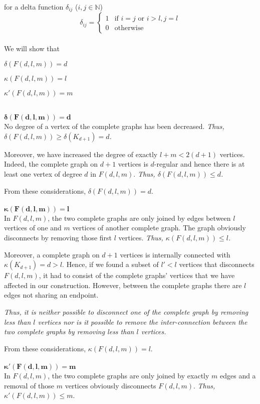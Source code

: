 \documentclass[a4paper]{article}
\begin{document}
\begin{solution}{14}
		for a delta function $\delta_{ij}$ ($i, j \in \mathbb{N}$)
		\begin{equation}
			\delta_{ij} =
					\begin{cases}
						1 & \text{if } i = j \text{ or }  i > l, j = l\\
						0 & \text{otherwise}
					\end{cases}
		\end{equation}\\
		We will show that
		\begin{compactitem}%
			\item $\delta(F(d,l,m)) = d$%
			\item $\kappa(F(d,l,m)) = l$%
			\item $\kappa'(F(d,l,m)) = m$%
		\end{compactitem}\ \\
		$\mathbf{\delta(F(d,l,m)) = d}$\\
		No degree of a vertex of the complete graphs has been decreased. \emph{Thus, $\delta(F(d,l,m)) \geq \delta(K_{d+1}) = d$.}

		Moreover, we have increased the degree of exactly $l + m < 2(d+1)$ vertices.  Indeed, the complete graph on $d+1$ vertices is $d$-regular and hence there is at least one vertex of degree $d$ in $F(d,l,m)$. \emph{Thus, $\delta(F(d,l,m)) \leq d$.}

		From these considerations, $\delta(F(d,l,m)) = d$.\ \\ \ \\
		$\mathbf{\kappa(F(d,l,m)) = l}$\\
		In $F(d,l,m)$, the two complete graphs are only joined by edges between $l$ vertices of one and $m$ vertices of another complete graph.
		The graph obviously disconnects by removing those first $l$ vertices. \emph{Thus, $\kappa(F(d,l,m)) \leq l$.}

		Moreover, a complete graph on $d+1$ vertices is internally connected with $\kappa(K_{d+1}) = d > l$. Hence, if we found a subset of $l' < l$ vertices that disconnects $F(d, l, m)$, it had to consist of the complete graphs' vertices that we have affected in our construction. However, between the complete graphs there are $l$ edges not sharing an endpoint.

		\emph{Thus, it is neither possible to disconnect one of the complete graph by removing less than $l$ vertices nor is it possible to remove the inter-connection between the two complete graphs by removing less than $l$ vertices.}

		From these considerations, $\kappa(F(d,l,m)) = l$.\ \\ \ \\
		$\mathbf{\kappa'(F(d,l,m)) = m}$\\
		In $F(d,l,m)$, the two complete graphs are only joined by exactly $m$ edges and a removal of those $m$ vertices obviously disconnects $F(d, l, m)$. \emph{Thus, $\kappa'(F(d,l,m)) \leq m$}.


\end{solution}
\end{document}
